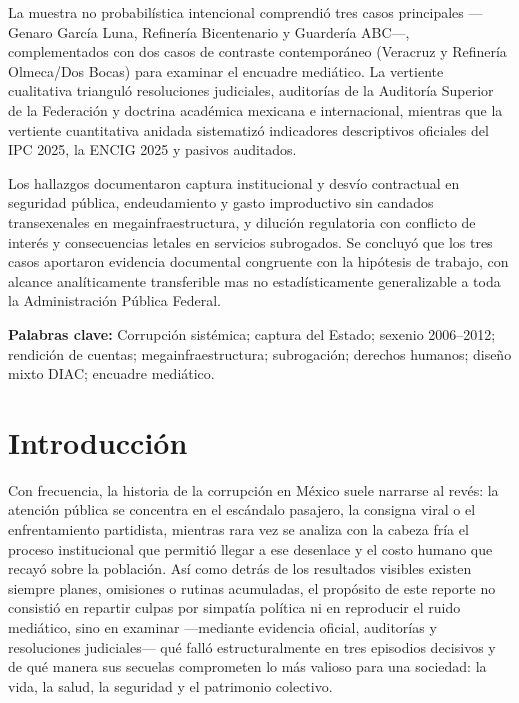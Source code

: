 \documentclass[12pt,letterpaper,oneside]{article}
\begin{document}
La muestra no probabilística intencional comprendió tres casos principales ---Genaro García Luna, Refinería Bicentenario y Guardería ABC---, complementados con dos casos de contraste contemporáneo (Veracruz y Refinería Olmeca/Dos Bocas) para examinar el encuadre mediático. La vertiente cualitativa trianguló resoluciones judiciales, auditorías de la Auditoría Superior de la Federación y doctrina académica mexicana e internacional, mientras que la vertiente cuantitativa anidada sistematizó indicadores descriptivos oficiales del IPC 2025, la ENCIG 2025 y pasivos auditados.

Los hallazgos documentaron captura institucional y desvío contractual en seguridad pública, endeudamiento y gasto improductivo sin candados transexenales en megainfraestructura, y dilución regulatoria con conflicto de interés y consecuencias letales en servicios subrogados. Se concluyó que los tres casos aportaron evidencia documental congruente con la hipótesis de trabajo, con alcance analíticamente transferible mas no estadísticamente generalizable a toda la Administración Pública Federal.

\textbf{Palabras clave:} Corrupción sistémica; captura del Estado; sexenio 2006--2012; rendición de cuentas; megainfraestructura; subrogación; derechos humanos; diseño mixto DIAC; encuadre mediático.

\clearpage


\section{Introducción}

Con frecuencia, la historia de la corrupción en México suele narrarse al revés: la atención pública se concentra en el escándalo pasajero, la consigna viral o el enfrentamiento partidista, mientras rara vez se analiza con la cabeza fría el proceso institucional que permitió llegar a ese desenlace y el costo humano que recayó sobre la población. Así como detrás de los resultados visibles existen siempre planes, omisiones o rutinas acumuladas, el propósito de este reporte no consistió en repartir culpas por simpatía política ni en reproducir el ruido mediático, sino en examinar ---mediante evidencia oficial, auditorías y resoluciones judiciales--- qué falló estructuralmente en tres episodios decisivos y de qué manera sus secuelas comprometen lo más valioso para una sociedad: la vida, la salud, la seguridad y el patrimonio colectivo.
\end{document}
